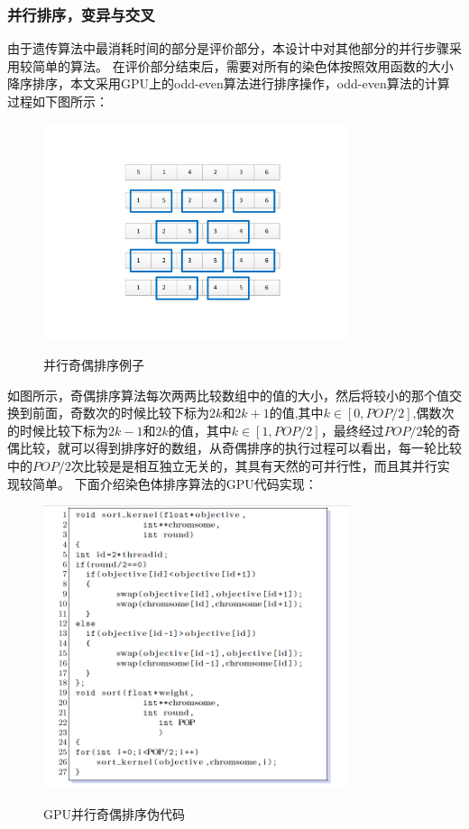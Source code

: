 \subsubsection{并行排序，变异与交叉}
  由于遗传算法中最消耗时间的部分是评价部分，本设计中对其他部分的并行步骤采用较简单的算法。
  在评价部分结束后，需要对所有的染色体按照效用函数的大小降序排序，本文采用GPU上的odd-even算法进行排序操作，odd-even算法的计算过程如下图所示：
\begin{figure}
  \begin{center}
    {\includegraphics[width=0.8\textwidth]{figures/odd-even.pdf}}
    \end{center}
  \caption{{\footnotesize{并行奇偶排序例子}}}
  \label{IterNum}
\end{figure}
  如图所示，奇偶排序算法每次两两比较数组中的值的大小，然后将较小的那个值交换到前面，奇数次的时候比较下标为$2k和2k+1$的值,其中$k \in [0,POP/2]$,偶数次的时候比较下标为$2k-1和2k$的值，其中$k \in[1,POP/2]$，最终经过$POP/2$轮的奇偶比较，就可以得到排序好的数组，从奇偶排序的执行过程可以看出，每一轮比较中的$POP/2$次比较是是相互独立无关的，其具有天然的可并行性，而且其并行实现较简单。
下面介绍染色体排序算法的GPU代码实现：
\begin{figure}
  \begin{center}
    {\includegraphics[width=0.8\textwidth]{figures/GPUoddeven.png}}
    \end{center}
  \caption{{\footnotesize{GPU并行奇偶排序伪代码}}}
  \label{IterNum}
\end{figure}

